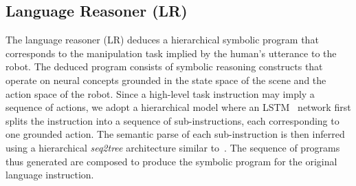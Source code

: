 \subsection{Language Reasoner (LR)}
%
The language reasoner (LR) deduces a hierarchical symbolic program that corresponds to the 
manipulation task implied by the human's utterance to the robot. 
%
The deduced program consists of symbolic reasoning constructs that operate on neural concepts grounded in the state space of the scene and the action space of the robot. 
%
%
% 
Since a high-level task instruction may imply a sequence of actions, we adopt a hierarchical model where an LSTM~\cite{lstm} network first splits the instruction into a sequence of sub-instructions, each corresponding to one grounded action. The semantic parse of each sub-instruction is then inferred using a hierarchical  \emph{seq2tree} architecture similar to~\cite{dong2016language,Mao2019NeuroSymbolic}. The sequence of programs thus generated are composed to produce the symbolic program for the original language instruction.
%
%
%
%


